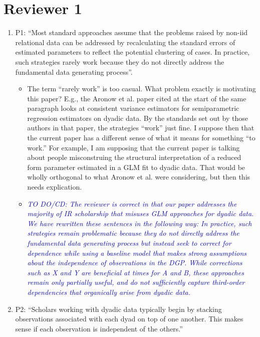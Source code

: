 \section*{Reviewer 1}

\begin{enumerate}
	\item P1: ``Most standard approaches assume that the problems raised by non-iid relational data can be addressed by recalculating the standard errors of estimated parameters to reflect the potential clustering of cases. In practice, such strategies rarely work because they do not directly address the fundamental data generating process''.
	\begin{itemize}
		\item The term “rarely work” is too casual.  What problem exactly is motivating this paper?  E.g., the Aronow et al. paper cited at the start of the same paragraph looks at consistent variance estimators for semiparametric regression estimators on dyadic data. By the standards set out by those authors in that paper, the strategies “work” just fine.  I suppose then that the current paper has a different sense of what it means for something “to work.” For example, I am supposing that the current paper is talking about people misconstruing the structural interpretation of a reduced form parameter estimated in a GLM fit to dyadic data.  That would be wholly orthogonal to what Aronow et al. were considering, but then this needs explication.
	\end{itemize}
	\begin{itemize}
		\item \textcolor{blue}{ \emph{
		TO DO/CD: The reviewer is correct in that our paper addresses the majority of IR scholarship that misuses GLM approaches for dyadic data. We have rewritten these sentences in the following way: In practice, such strategies remain problematic because they do not directly address the fundamental data generating process but instead seek to correct for dependence while using a baseline model that makes strong assumptions about the independence of observations in the DGP. While corrections such as X and Y are beneficial at times for A and B, these approaches remain only partially useful, and do not sufficiently capture third-order dependencies that organically arise from dyadic data. 
		}}
	\end{itemize}
	\item P2: “Scholars working with dyadic data typically begin by stacking observations associated with each dyad on top of one another. This makes sense if each observation is independent of the others.”

\end{enumerate}
